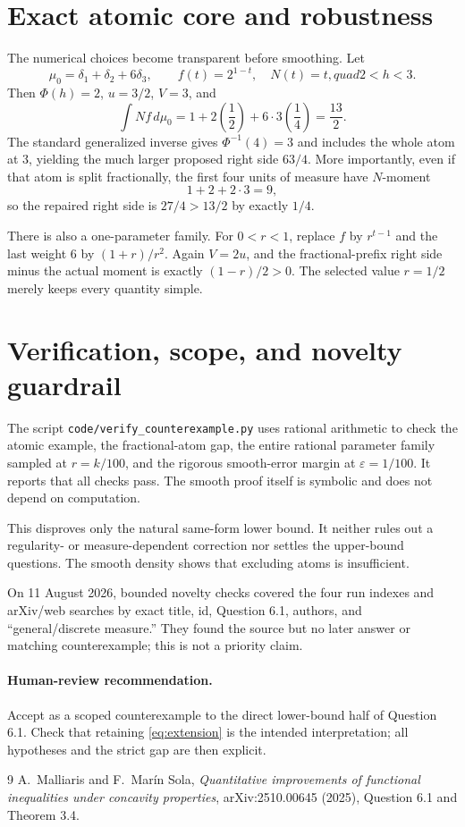\documentclass[11pt]{article}
\begin{document}
\section{Exact atomic core and robustness}

The numerical choices become transparent before smoothing.  Let
\[
 \mu_0=\delta_1+\delta_2+6\delta_3,
 \qquad f(t)=2^{1-t},\quad N(t)=t,quad 2<h<3.
\]
Then $\Phi(h)=2$, $u=3/2$, $V=3$, and
\[
 \int Nf\,d\mu_0=1+2\left(\frac12\right)
       +6\cdot3\left(\frac14\right)=\frac{13}{2}.
\]
The standard generalized inverse gives $\Phi^{-1}(4)=3$ and includes the
whole atom at $3$, yielding the much larger proposed right side $63/4$.
More importantly, even if that atom is split fractionally, the first four
units of measure have $N$-moment
\[
 1+2+2\cdot3=9,
\]
so the repaired right side is $27/4>13/2$ by exactly $1/4$.

There is also a one-parameter family.  For $0<r<1$, replace $f$ by
$r^{t-1}$ and the last weight $6$ by $(1+r)/r^2$.  Again $V=2u$, and the
fractional-prefix right side minus the actual moment is exactly
$(1-r)/2>0$.  The selected value $r=1/2$ merely keeps every quantity simple.

\section{Verification, scope, and novelty guardrail}

The script \texttt{code/verify\_counterexample.py} uses rational arithmetic
to check the atomic example, the fractional-atom gap, the entire rational
parameter family sampled at $r=k/100$, and the rigorous smooth-error margin
at $\varepsilon=1/100$.  It reports that all checks pass.  The smooth proof
itself is symbolic and does not depend on computation.

This disproves only the natural same-form lower bound.  It neither rules out
a regularity- or measure-dependent correction nor settles the upper-bound
questions.  The smooth density shows that excluding atoms is insufficient.

On 11 August 2026, bounded novelty checks covered the four run indexes and
arXiv/web searches by exact title, id, Question 6.1, authors, and
``general/discrete measure.''  They found the source but no later answer or
matching counterexample; this is not a priority claim.

\paragraph{Human-review recommendation.}
Accept as a scoped counterexample to the direct lower-bound half of Question
6.1.  Check that retaining \eqref{eq:extension} is the intended
interpretation; all hypotheses and the strict gap are then explicit.

\begin{thebibliography}{9}
A.~Malliaris and F.~Mar\'in Sola,
\emph{Quantitative improvements of functional inequalities under concavity
properties}, arXiv:2510.00645 (2025), Question 6.1 and Theorem 3.4.
\end{thebibliography}
\end{document}
